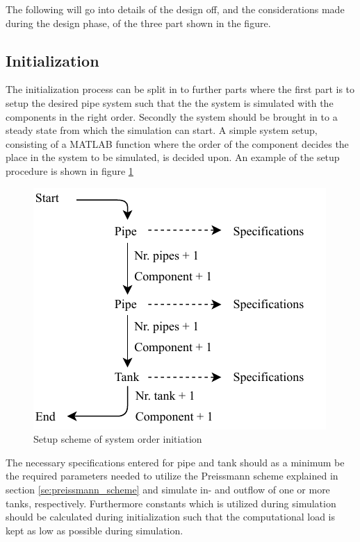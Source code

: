 The following will go into details of the design off, and the considerations made during the design phase, of the three part shown in the figure.

\subsection*{Initialization} 
The initialization process can be split in to further parts where the first part is to setup the desired pipe system such that the the system is simulated with the components in the right order.
Secondly the system should be brought in to a steady state from which the simulation can start. A simple system setup, consisting of a MATLAB function where the order of the component decides the place in the system to be simulated, is decided upon. An example of the setup procedure is shown in figure \ref{fig:sys_setup}  

\begin{figure}[H]
\centering
\includegraphics[width=0.55 \textwidth]{report/simulation/pictures/sys_setup.pdf}
\caption{Setup scheme of system order initiation}
\label{fig:sys_setup}
\end{figure}

The necessary specifications entered for pipe and tank should as a minimum be the required parameters needed to utilize the Preissmann scheme explained in section \ref{se:preissmann_scheme} and simulate in- and outflow of one or more tanks, respectively. Furthermore constants which is utilized during simulation should be calculated during initialization such that the computational load is kept as low as possible during simulation.        